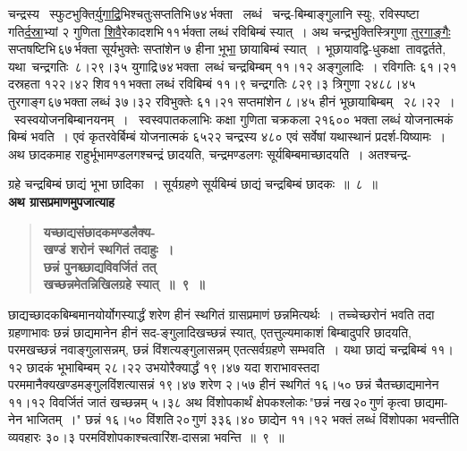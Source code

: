 \documentclass[11pt, openany]{book}
\begin{document}
चन्द्रस्य ~स्फुटभुक्ति\hyperref[4.8]{र्युगाद्रि}भिश्चतुःसप्ततिभि\textendash \,७४\textendash \,र्भक्ता ~लब्धं ~चन्द्र-बिम्बाङ्गुलानि स्युः, रविस्पष्टा गति\hyperref[4.8]{र्दस्रा}भ्यां २ गुणिता \hyperref[4.8]{शिवै}रेकादशभि\textendash \,११\textendash \,र्भक्ता लब्धं रविबिम्बं स्यात्~। अथ चन्द्रभुक्तिस्त्रिगुणा \hyperref[4.8]{तुरगाङ्गैः} सप्तषष्टिभि\textendash \,६७\textendash \,र्भक्ता सूर्यभुक्तेः सप्तांशेन ७ हीना \hyperref[4.8]{भूभा} छायाबिम्बं स्यात्~। भूछायावद्वि-धुकक्षा \,तावद्वर्तते, \,यथा \,चन्द्रगतिः \,८।२९।३५ युगाद्रि\textendash \,७४\textendash \,भक्ता \,लब्धं चन्द्रबिम्बम् ११।१२ अङ्गुलादिः~। रविगतिः ६१।२१ दस्रहता १२२।४२ शिव\textendash \,११\textendash \,भक्ता \;लब्धं \;रविबिम्बं \;११।९ \;चन्द्रगतिः \;८२९।३ \;त्रिगुणा \;२४८८।४५ तुरगाङ्ग\textendash \,६७\textendash \,भक्ता लब्धं ३७।३२ रविभुक्तेः ६१।२१ सप्तमांशेन ८।४५ हीनं भूछायाबिम्बम् ~२८।२२~। ~स्वस्वयोजनबिम्बानयनम्~। ~स्वस्वपातकलाभिः कक्षा गुणिता चक्रकला २१६०० भक्ता लब्धं योजनात्मकं बिम्बं भवति~। एवं कृतरवेर्बिम्बं योजनात्मकं ६५२२ चन्द्रस्य ४८० एवं सर्वेषां यथास्थानं प्रदर्श-यिष्यामः~। अथ छादकमाह राहुर्भूभामण्डलगश्चन्द्रं छादयति, चन्द्रमण्डलगः सूर्यबिम्बमाच्छादयति~। अतश्चन्द्र-

\newpage

\noindent ग्रहे \;चन्द्रबिम्बं \;छाद्यं \;भूभा \;छादिका~। सूर्यग्रहणे \;सूर्यबिम्बं \;छाद्यं \;चन्द्रबिम्बं छादकः~॥~८~॥\\

{\small \textbf{अथ ग्रासप्रमाणमुपजात्याह\textendash }}

 \label{4.9}
\begin{quote}
{\large \textbf{{\color{purple}यच्छाद्यसंछादकमण्डलैक्य-\\
खण्डं शरोनं स्थगितं तदाहुः~। \\छन्नं पुनश्च्छाद्यविवर्जितं तत् \\
खच्छन्नमेतन्निखिलग्रहे स्यात्~॥~९~॥}}}
\end{quote}

छाद्यच्छादकबिम्बमानयोर्योगस्यार्द्धं \;शरेण \;हीनं \;स्थगितं \;ग्रासप्रमाणं छन्नमित्यर्थः~। तच्चेच्छरोनं भवति तदा ग्रहणाभावः छन्नं छाद्यमानेन हीनं सद-ङ्गुलादिखच्छन्नं स्यात्, एतत्तुल्यमाकाशं बिम्बादुपरि छादयति, परमखच्छन्नं नवाङ्गुलासन्नम्, छन्नं विंशत्यङ्गुलासन्नम् एतत्सर्वग्रहणे सम्भवति~। यथा छाद्यं चन्द्रबिम्बं ११।१२ छादकं भूभाबिम्बम् २८।२२ उभयोरैक्यार्द्धं १९।४७ यदा शराभावस्तदा \;परममानैक्यखण्डमङ्गुलविंशत्यासन्नं \;१९।४७ \;शरेण \;२।५७ हीनं स्थगितं १६।५० छन्नं चैतच्छाद्यमानेन ११।१२ विवर्जितं जातं खच्छन्नम् ५।३८ अथ विंशोपकार्थं क्षेपकश्लोकः\textendash \,{\color{violet}"छन्नं नख\textendash \,२०\textendash \,गुणं कृत्वा छाद्यमा-नेन भाजितम्~।"} छन्नं १६।५० विंशति\textendash \,२०\textendash \,गुणं ३३६।४० छाद्येन ११।१२ भक्तं लब्धं विंशोपका भवन्तीति व्यवहारः ३०।३ परमविंशोपकाश्चत्वारिंश-दासन्ना भवन्ति~॥~९~॥
\end{document}
